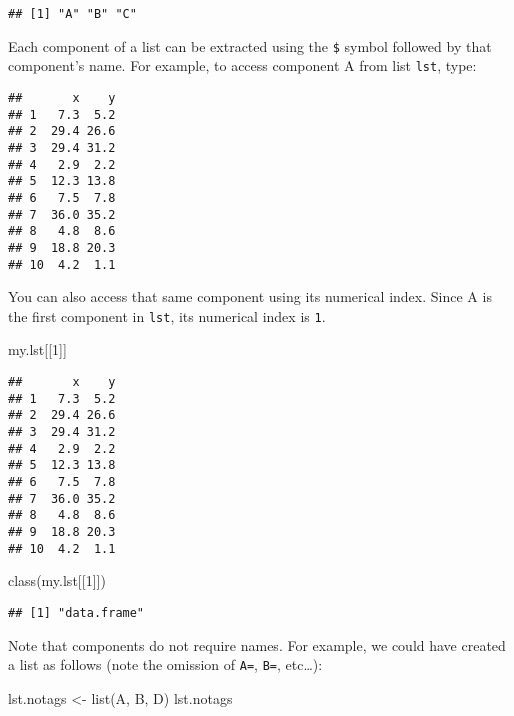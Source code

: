 \documentclass[
]{article}
\newenvironment{Shaded}{\begin{snugshade}}{\end{snugshade}}
\newcommand{\DecValTok}[1]{\textcolor[rgb]{0.00,0.00,0.81}{#1}}
\newcommand{\FunctionTok}[1]{\textcolor[rgb]{0.00,0.00,0.00}{#1}}
\newcommand{\NormalTok}[1]{#1}
\newcommand{\OtherTok}[1]{\textcolor[rgb]{0.56,0.35,0.01}{#1}}
\newcommand{\SpecialCharTok}[1]{\textcolor[rgb]{0.00,0.00,0.00}{#1}}
\begin{document}
\begin{verbatim}
## [1] "A" "B" "C"
\end{verbatim}

Each component of a list can be extracted using the \texttt{\$} symbol
followed by that component's name. For example, to access component A
from list \texttt{lst}, type:

\begin{Shaded}
\end{Shaded}

\begin{verbatim}
##       x    y
## 1   7.3  5.2
## 2  29.4 26.6
## 3  29.4 31.2
## 4   2.9  2.2
## 5  12.3 13.8
## 6   7.5  7.8
## 7  36.0 35.2
## 8   4.8  8.6
## 9  18.8 20.3
## 10  4.2  1.1
\end{verbatim}

You can also access that same component using its numerical index. Since
A is the first component in \texttt{lst}, its numerical index is
\texttt{1}.

\begin{Shaded}
\begin{Highlighting}[]
\NormalTok{my.lst[[}\DecValTok{1}\NormalTok{]]}
\end{Highlighting}
\end{Shaded}

\begin{verbatim}
##       x    y
## 1   7.3  5.2
## 2  29.4 26.6
## 3  29.4 31.2
## 4   2.9  2.2
## 5  12.3 13.8
## 6   7.5  7.8
## 7  36.0 35.2
## 8   4.8  8.6
## 9  18.8 20.3
## 10  4.2  1.1
\end{verbatim}

\begin{Shaded}
\begin{Highlighting}[]
\FunctionTok{class}\NormalTok{(my.lst[[}\DecValTok{1}\NormalTok{]])}
\end{Highlighting}
\end{Shaded}

\begin{verbatim}
## [1] "data.frame"
\end{verbatim}

Note that components do not require names. For example, we could have
created a list as follows (note the omission of \texttt{A=},
\texttt{B=}, etc\ldots):

\begin{Shaded}
\begin{Highlighting}[]
\NormalTok{lst.notags }\OtherTok{\textless{}{-}} \FunctionTok{list}\NormalTok{(A, B, D)}
\NormalTok{lst.notags}
\end{Highlighting}
\end{Shaded}
\end{document}
